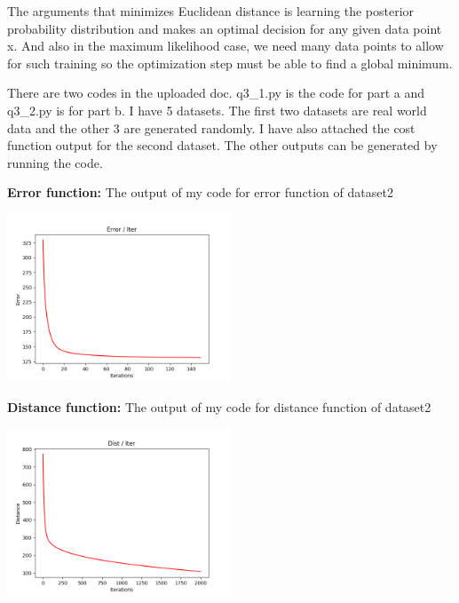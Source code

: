 \documentclass[twoside]{article}
\begin{document}
\begin{enumerate}
The arguments that minimizes Euclidean
distance is learning the posterior probability distribution and makes an optimal decision for
any given data point x. And also in the maximum likelihood case, we need many data points to allow for such
training so the optimization step must be able to find a global minimum.

There are two codes in the uploaded doc. q3\_1.py is the code for part a and q3\_2.py is for part b. I have 5 datasets. The first two datasets are real world data and the other 3 are generated randomly. I have also attached the cost function output for the second dataset. The other outputs can be generated by running the code.

\textbf{Error function:}
The output of my code for error function of dataset2

\includegraphics[width=0.5\textwidth]{images/err_dset2.png}

\break

\textbf{Distance function:}
The output of my code for distance function of dataset2

\includegraphics[width=0.5\textwidth]{images/dist_dset2.png}

\end{enumerate}
\end{document}
